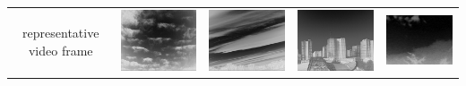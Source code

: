 \documentclass[journal]{IEEEtran}
\begin{document}
\begin{table}[t]
\begin{tabular}{|c|m{3cm}<{\centering}|m{3cm}<{\centering}|m{3cm}<{\centering}|m{3.2cm}<{\centering}|}
    representative video frame& \includegraphics[scale=0.33]{back1.png}& \includegraphics[scale=0.25]{back2.png}& \includegraphics[scale=0.33]{back3.png}& \includegraphics[scale=0.3]{back4.png}\\

\end{tabular}
\end{table}
\end{document}
